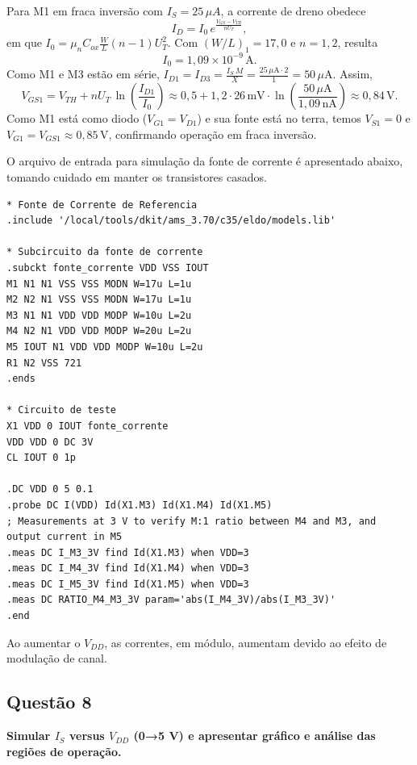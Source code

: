 ﻿\documentclass[12pt,a4paper]{article}
\begin{document}
Para M1 em fraca inversão com $I_S = 25\,\mu A$, a corrente de dreno obedece
\begin{equation}
I_D = I_0\, e^{\frac{V_{GS} - V_{TH}}{nU_T}},
\end{equation}
em que $I_0 = \mu_n C_{ox} \tfrac{W}{L} (n-1)U_T^2$. Com $(W/L)_1=17{,}0$ e $n=1{,}2$, resulta
\begin{equation*}
I_0 = 1{,}09 \times 10^{-9}\,\text{A}.
\end{equation*}
Como M1 e M3 estão em série, $I_{D1}=I_{D3}=\tfrac{I_S\,M}{X}=\tfrac{25\,\mu\text{A}\cdot 2}{1}=50\,\mu\text{A}$. Assim,
\begin{equation*}
V_{GS1} = V_{TH} + nU_T\,\ln\!\left(\frac{I_{D1}}{I_0}\right) \approx 0{,}5 + 1{,}2\cdot 26\,\text{mV}\cdot \ln\!\left(\frac{50\,\mu\text{A}}{1{,}09\,\text{nA}}\right) \approx 0{,}84\,\text{V}.
\end{equation*}
Como M1 está como diodo ($V_{G1}=V_{D1}$) e sua fonte está no terra, temos $V_{S1}=0$ e $V_{G1}=V_{GS1}\approx 0{,}85\,\text{V}$, confirmando operação em fraca inversão.

O arquivo de entrada para simulação da fonte de corrente é apresentado abaixo, tomando cuidado em manter os transistores casados.

\begin{lstlisting}[caption={Arquivo de simulação da fonte de corrente}]
* Fonte de Corrente de Referencia
.include '/local/tools/dkit/ams_3.70/c35/eldo/models.lib'

* Subcircuito da fonte de corrente
.subckt fonte_corrente VDD VSS IOUT
M1 N1 N1 VSS VSS MODN W=17u L=1u
M2 N2 N1 VSS VSS MODN W=17u L=1u
M3 N1 N1 VDD VDD MODP W=10u L=2u
M4 N2 N1 VDD VDD MODP W=20u L=2u
M5 IOUT N1 VDD VDD MODP W=10u L=2u
R1 N2 VSS 721
.ends

* Circuito de teste
X1 VDD 0 IOUT fonte_corrente
VDD VDD 0 DC 3V
CL IOUT 0 1p

.DC VDD 0 5 0.1
.probe DC I(VDD) Id(X1.M3) Id(X1.M4) Id(X1.M5)
; Measurements at 3 V to verify M:1 ratio between M4 and M3, and output current in M5
.meas DC I_M3_3V find Id(X1.M3) when VDD=3
.meas DC I_M4_3V find Id(X1.M4) when VDD=3
.meas DC I_M5_3V find Id(X1.M5) when VDD=3
.meas DC RATIO_M4_M3_3V param='abs(I_M4_3V)/abs(I_M3_3V)'
.end
\end{lstlisting}

Ao aumentar o $V_{DD}$, as correntes, em módulo, aumentam devido ao efeito de modulação de canal.

\subsection*{Questão 8}
	\textbf{Simular $I_S$ versus $V_{DD}$ (0→5 V) e apresentar gráfico e análise das regiões de operação.}
\end{document}
